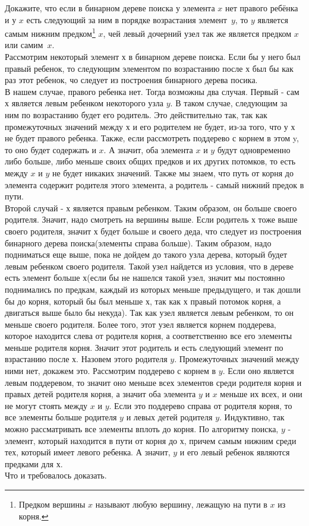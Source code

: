 \documentclass[12pt]{extreport}
\theoremstyle{definiton}
\theoremstyle{definition}
\theoremstyle{definition}
\begin{document}
			\Pr[4] Докажите, что если в бинарном дереве поиска у элемента $x$ нет правого ребёнка и у $x$ есть следующий за ним в порядке возрастания элемент~$y$, то $y$ является самым нижним предком\footnote{Предком вершины $x$ называют любую вершину, лежащую на пути в $x$ из корня.} $x$, чей левый дочерний узел так же является предком $x$ или самим~$x$.
			\newline
            \\Рассмотрим некоторый элемент х в бинарном дереве поиска. Если бы у него был правый ребенок, то следующим элементом по возрастанию после х был бы как раз этот ребенок, чо следует из построения бинарного дерева посика.
            \\ В нашем случае, правого ребенка нет. Тогда возможны два случая. Первый - сам х является левым ребенком некоторого узла $y$. В таком случае, следующим за ним по возрастанию будет его родитель. Это действительно так, так как промежуточных значений между х и его родителем не будет, из-за того, что у х не будет правого ребенка. Также, если рассмотреть поддерево с корнем в этом y, то оно будет содержать и $x$. А значит, оба элемента $x$ и $y$ будут одновременно либо больше, либо меньше своих общих предков и их других потомков, то есть между $x$ и $y$ не будет никаких значений. Также мы знаем, что путь от корня до элемента содержит родителя этого элемента, а родитель - самый нижний предок в пути.
            \\Второй случай - $х$ является правым ребенком. Таким образом, он больше своего родителя. Значит, надо смотреть на вершины выше. Если родитель $х$ тоже выше своего родителя, значит $х$ будет больше и своего деда, что следует из построения бинарного дерева поиска(элементы справа больше). Таким образом, надо подниматься еще выше, пока не дойдем до такого узла дерева, который будет левым ребенком своего родителя. Такой узел найдется из условия, что в дереве есть элемент больше $х$(если бы не нашелся такой узел, значит мы постоянно поднимались по предкам, каждый из которых меньше предыдущего, и так дошли бы до корня, который бы был меньше $х$, так как $х$ правый потомок корня, а двигаться выше было бы некуда). Так как узел является левым ребенком, то он меньше своего родителя. Более того, этот узел является корнем поддерева, которое находится слева от родителя корня, а соответственно все его элементы меньше родителя корня. Значит этот родитель и есть следующий элемент по взрастанию после $х$. Назовем этого родителя $y$. Промежуточных значений между ними нет, докажем это. Рассмотрим поддерево с корнем в $y$. Если оно является левым поддеревом, то значит оно меньше всех элементов среди родителя корня и правых детей родителя корня, а значит оба элемента $y$ и $x$ меньше их всех, и они не могут стоять между $x$ и $y$. Если это поддерево справа от родителя корня, то все элементы больше родителя $y$ и левых детей родителя $y$. Индуктивно, так можно рассматривать все элементы вплоть до корня. По алгоритму поиска, $y$ - элемент, который находится в пути от корня до $х$, причем самым нижним среди тех, который имеет левого ребенка. А значит, $y$ и его левый ребенок являются предками для $х$.
            \\Что и требовалось доказать.
\end{document}
